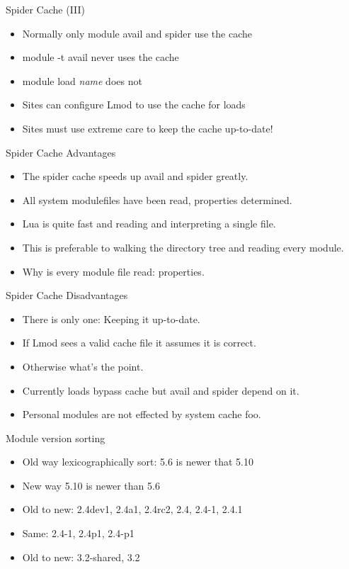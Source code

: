 \documentclass[dvipsnames,aspectratio=169]{beamer}
\begin{document}
\begin{frame}{Spider Cache (III)}
  \begin{itemize}
    \item Normally only module avail and spider use the cache
    \item module -t avail never uses the cache
    \item module load \emph{name} does not
    \item Sites can configure Lmod to use the cache for loads
    \item Sites must use extreme care to keep the cache up-to-date!
  \end{itemize}
\end{frame}

\begin{frame}{Spider Cache Advantages}
  \begin{itemize}
    \item The spider cache speeds up avail and spider greatly.
    \item All system modulefiles have been read, properties determined.
    \item Lua is quite fast and reading and interpreting a single file.
    \item This is preferable to walking the directory tree and reading
      every module.
    \item Why is every module file read: properties.
  \end{itemize}
\end{frame}

\begin{frame}{Spider Cache Disadvantages}
  \begin{itemize}
    \item There is only one: Keeping it up-to-date.
    \item If Lmod sees a valid cache file it assumes it is correct.
    \item Otherwise what's the point.
    \item Currently loads bypass cache but avail and spider depend on it.
    \item Personal modules are not effected by system cache foo.
  \end{itemize}
\end{frame}

\begin{frame}{Module version sorting}
  \begin{itemize}
    \item Old way lexicographically sort: 5.6 is newer that 5.10
    \item New way 5.10 is newer than 5.6
    \item Old to new: 2.4dev1, 2.4a1, 2.4rc2, 2.4, 2.4-1, 2.4.1
    \item Same: 2.4-1, 2.4p1, 2.4-p1
    \item Old to new: 3.2-shared, 3.2
  \end{itemize}
\end{frame}
\end{document}
